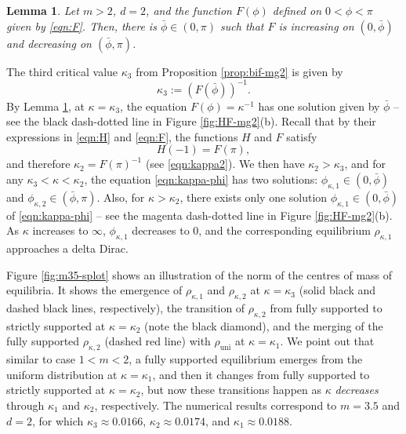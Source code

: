 \documentclass[11pt]{amsart}
\newtheorem{lemma}{Lemma}[section]
\newcommand{\rhou}{\rho_{\mathrm{uni}}}
\newcommand{\dm}{d} %
\begin{document}
\begin{lemma}\cite[Lemma 6.1]{FePaVa2025}
\label{lem:F-monotone-mg2}
Let $m>2$, $\dm=2$, and the function $F(\phi)$ defined on $0<\phi<\pi$ given by \eqref{eqn:F}. Then, there is $\bar{\phi} \in (0,\pi)$ such that $F$ is increasing on $(0,\bar{\phi})$ and decreasing on $(\bar{\phi}, \pi)$. 
\end{lemma}

The third critical value $\kappa_3$ from Proposition \ref{prop:bif-mg2} is given by
\begin{equation}
\label{eqn:kappa3}
\kappa_3:= (F(\bar{\phi}))^{-1}.
\end{equation}
By Lemma \ref{lem:F-monotone-mg2}, at $\kappa=\kappa_3$, the equation $F(\phi) = \kappa^{-1}$ has one solution given by $\bar{\phi}$ -- see the black dash-dotted line in Figure \ref{fig:HF-mg2}(b). Recall that by their expressions in \eqref{eqn:H} and \eqref{eqn:F}, the functions $H$ and $F$ satisfy 
\begin{equation}
\label{eqn:HF-rel}
H(-1)=F(\pi),
\end{equation}
and therefore $\kappa_2 = F(\pi)^{-1}$ (see \eqref{eqn:kappa2}). We then have $\kappa_2 > \kappa_3$, and for any $\kappa_3<\kappa<\kappa_2$, the equation \eqref{eqn:kappa-phi} has two solutions: $\phi_{\kappa,1} \in (0, \bar{\phi})$ and $\phi_{\kappa,2} \in (\bar{\phi},\pi)$. Also, for $\kappa >\kappa_2$, there exists only one solution $\phi_{\kappa,1} \in (0, \bar{\phi})$ of \eqref{eqn:kappa-phi} -- see the magenta dash-dotted line in Figure \ref{fig:HF-mg2}(b). As $\kappa$ increases to $\infty$, $\phi_{\kappa,1}$ decreases to $0$, and the corresponding equilibrium $\rho_{\kappa,1}$ approaches a delta Dirac.

 Figure \ref{fig:m35-splot} shows an illustration of the norm of the centres of mass of equilibria. It shows the emergence of $\rho_{\kappa,1}$ and $\rho_{\kappa,2}$ at $\kappa=\kappa_3$ (solid black and dashed black lines, respectively), the transition of $\rho_{\kappa,2}$ from fully supported to strictly supported at $\kappa=\kappa_2$ (note the black diamond), and the merging of the fully supported $\rho_{\kappa,2}$ (dashed red line) with $\rhou$ at $\kappa= \kappa_1$. We point out that similar to case $1<m<2$, a fully supported equilibrium emerges from the uniform distribution at $\kappa=\kappa_1$, and then it changes from fully supported to strictly supported at $\kappa=\kappa_2$, but now these transitions happen as $\kappa$ {\em decreases} through $\kappa_1$ and $\kappa_2$, respectively. The numerical results correspond to $m=3.5$ and $\dm=2$, for which $\kappa_3 \approx 0.0166$, $\kappa_2 \approx 0.0174$, and $\kappa_1 \approx 0.0188$.
\end{document}
